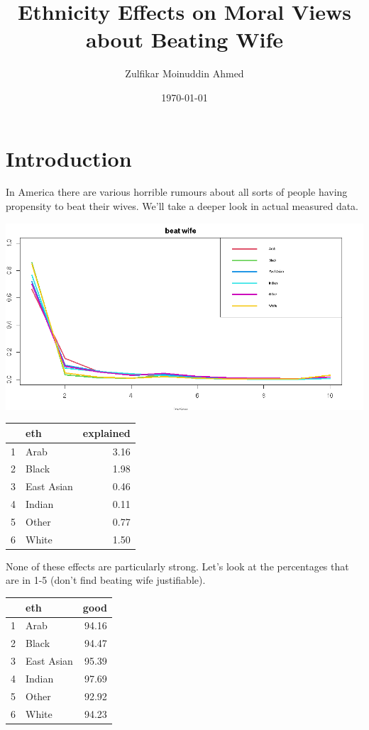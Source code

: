 \documentclass{amsart}
\title{Ethnicity Effects on Moral Views about Beating Wife}
\author{Zulfikar Moinuddin Ahmed}
\date{\today}
\begin{document}
\maketitle

\section{Introduction}

In America there are various horrible rumours about all sorts of people having propensity to beat their wives.  We'll take a deeper look in actual measured data.

\includegraphics[scale=0.5]{ethbeatwife.jpeg}

\begin{table}[ht]
\centering
\begin{tabular}{rlr}
  \hline
 & eth & explained \\ 
  \hline
1 & Arab & 3.16 \\ 
  2 & Black & 1.98 \\ 
  3 & East Asian & 0.46 \\ 
  4 & Indian & 0.11 \\ 
  5 & Other & 0.77 \\ 
  6 & White & 1.50 \\ 
   \hline
\end{tabular}
\end{table}

None of these effects are particularly strong.  Let's look at the percentages that are in 1-5 (don't find beating wife justifiable).
\begin{table}[ht]
\centering
\begin{tabular}{rlr}
  \hline
 & eth & good \\ 
  \hline
1 & Arab & 94.16 \\ 
  2 & Black & 94.47 \\ 
  3 & East Asian & 95.39 \\ 
  4 & Indian & 97.69 \\ 
  5 & Other & 92.92 \\ 
  6 & White & 94.23 \\ 
   \hline
\end{tabular}
\end{table}
\end{document}
